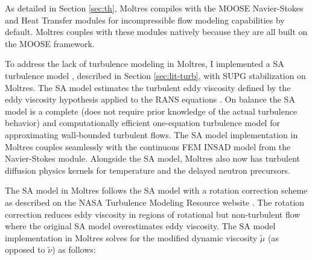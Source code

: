 As detailed in Section \ref{sec:th}, Moltres compiles with the MOOSE Navier-Stokes
\cite{peterson_overview_2018} and Heat Transfer modules for incompressible flow
modeling capabilities by default. Moltres couples with these modules natively because they are all
built on the MOOSE framework.

To address the lack of turbulence modeling in Moltres, I implemented a \gls{SA} turbulence model
\cite{spalart_one-equation_1994}, described in Section \ref{sec:lit-turb}, with \gls{SUPG}
stabilization on Moltres. The \gls{SA} model estimates the turbulent eddy viscosity defined by the
eddy viscosity hypothesis applied to the \gls{RANS} equations \cite{rodi_turbulence_2017}.
On balance the \gls{SA} model is a complete (does not require prior
knowledge of the actual turbulence behavior) and computationally efficient one-equation turbulence
model for approximating wall-bounded turbulent flows. The \gls{SA} model implementation in Moltres
couples seamlessly with the continuous \gls{FEM} \gls{INSAD}
\cite{peterson_overview_2018, lindsay_automatic_2021} model
from the Navier-Stokes module. Alongside the \gls{SA} model, Moltres also now has turbulent
diffusion physics kernels for temperature and the delayed neutron precursors.

The SA model in Moltres follows the \gls{SA} model with a rotation correction scheme
\cite{aupoix_extensions_2003, dacles-mariani_numericalexperimental_1995} as described on the
\gls{NASA} Turbulence Modeling Resource website \cite{rumsey_turbulence_nodate}. The rotation
correction reduces eddy viscosity in regions of rotational but non-turbulent flow where the
original \gls{SA} model overestimates eddy viscosity. The \gls{SA} model implementation in Moltres
solves for the modified dynamic viscosity $\tilde{\mu}$ (as opposed to $\tilde{\nu}$) as follows:

